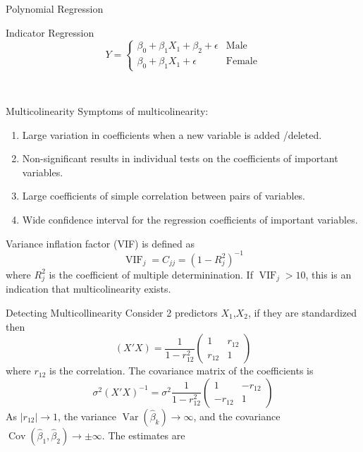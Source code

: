 \documentclass{article}
\DeclareMathOperator{\Var}{Var}
\DeclareMathOperator{\Cov}{Cov}
\DeclareMathOperator{\vif}{VIF}
\begin{document}
\begin{multicols*}{3}
\begin{blackbox}{Polynomial Regression}
\begin{brownbox}{Indicator Regression}
            \[Y = \begin{cases}
            \beta_0 + \beta_1X_1 + \beta_2 + \epsilon & \text{Male}\\
            \beta_0 + \beta_1X_1 + \epsilon & \text{Female}
            \end{cases}\]
        \end{brownbox}\\[-2ex]
    \end{blackbox}
    \begin{blackbox}{Multicolinearity}
        Symptoms of multicolinearity:
        \begin{enumerate}[leftmargin=7pt]
            \item Large variation in coefficients when a new variable is added /deleted.
            \item Non-significant results in individual tests on the coefficients of important variables.
            \item Large coefficients of simple correlation between pairs of variables. 
            \item Wide confidence interval for the regression coefficients of important variables.
        \end{enumerate}
        Variance inflation factor (VIF) is defined as \\[-2ex]
        \[\vif_j = C_{jj} = (1-R^2_j)^{-1}\]
        where $R^2_j$ is the coefficient of multiple determinination. If $\vif_j > 10$, this is an indication that multicolinearity exists.\\
    \end{blackbox}
    \begin{blackbox}{Detecting Multicollinearity}
        Consider 2 predictors $X_1$,$X_2$, if they are standardized then \\[-4ex]
        \[(X'X) = \frac{1}{1-r_{12}^2}\begin{pmatrix}
            1 & r_{12}\\
            r_{12} & 1
        \end{pmatrix}\]
        where $r_{12}$ is the correlation. The covariance matrix of the coefficients is \\[-3ex]
        \[\sigma^2(X'X)^{-1} = \sigma^2 \frac{1}{1-r_{12}^2}\begin{pmatrix}
            1 & -r_{12} \\
            -r_{12} & 1
        \end{pmatrix}\]
        As $|r_{12}| \rightarrow 1$, the variance $\Var(\hat{\beta}_k) \rightarrow \infty$, and the covariance $\Cov(\hat{\beta}_1, \hat{\beta}_2) \rightarrow \pm \infty$. The estimates are \\[-2ex]
        

\end{blackbox}
\end{multicols*}
\end{document}
